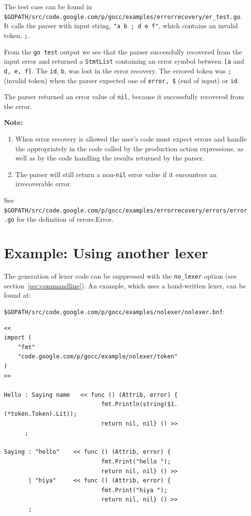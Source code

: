 \documentclass[12pt]{article}
\begin{document}
	The test case can be found in \\
	\verb|$GOPATH/src/code.google.com/p/gocc/examples/errorrecovery/er_test.go|. \\
	It calls the parser with input string, \verb|"a b ; d e f"|, which contains an invalid token, \verb|;|.

	From the \verb|go test| output we see that the parser successfully recovered from the input error and returned a \verb|StmtList| containing an error symbol between \verb|[a| and \verb|d, e, f]|. The \verb|id|, \verb|b|, was lost in the error recovery.  The errored token was \verb|;| (invalid token) when the parser expected one of \verb|error, $| (end of input) or \verb|id|.

	The parser returned an error value of \verb|nil|, because it successfully recovered from the error.

	{\bf Note:} \\
	\begin{enumerate}
		\item When error recovery is allowed the user's code must expect errors and handle the appropriately in the code called by the production action expressions, as well as by the code handling the results returned by the parser.

		\item The parser will still return a non-\verb|nil| error value if it encounters an irrecoverable error.
	\end{enumerate}

	See \verb|$GOPATH/src/code.google.com/p/gocc/examples/errorrecovery/errors/error.go| for the definition of errors.Error.

\section{Example: Using another lexer} \label{sec:no lexer}
	The generation of lexer code can be suppressed with the \verb|no_lexer| option (see section~\ref{sec:commandline}). An example, 
	which uses a hand-written lexer, can be found at: 

	\verb|$GOPATH/src/code.google.com/p/gocc/examples/nolexer/nolexer.bnf|:

	\begin{verbatim}
<<
import (
    "fmt"
    "code.google.com/p/gocc/example/nolexer/token"
)
>>

Hello : Saying name   << func () (Attrib, error) {
                            fmt.Println(string($1.(*token.Token).Lit)); 
                            return nil, nil} () >> 
      ;

Saying : "hello"    << func () (Attrib, error) {
                            fmt.Print("hello "); 
                            return nil, nil} () >>
       | "hiya"     << func () (Attrib, error) {
                            fmt.Print("hiya "); 
                            return nil, nil} () >>
       ;	
    \end{verbatim}
\end{document}
